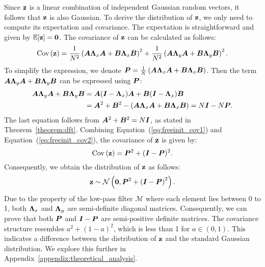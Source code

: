 Since $\mathbf{z}$ is a linear combination of independent Gaussian random vectors, it follows that $\mathbf{z}$ is also Gaussian. To derive the distribution of $\mathbf{z}$, we only need to compute its expectation and covariance.
The expectation is straightforward and given by $\mathbb{E}[\mathbf{z}]=\mathbf{0}$. 
The covariance of $\mathbf{z}$ can be calculated as follows:
\begin{equation}
\label{eq:freeinit_cov1}
    \mathrm{Cov}\left(\mathbf{z}\right) 
    = \frac{1}{N^2}\left( {\bm{A}}{\bm{\Lambda}}_x{\bm{A}} + {\bm{B}}{\bm{\Lambda}}_x{\bm{B}}\right)^2 +
      \frac{1}{N^2}\left( {\bm{A}}{\bm{\Lambda}}_y{\bm{A}} + {\bm{B}}{\bm{\Lambda}}_y{\bm{B}}\right)^2.
\end{equation}
To simplify the expression, we denote ${\bm{P}} = \frac{1}{N}\left( {\bm{A}}{\bm{\Lambda}}_x{\bm{A}}+{\bm{B}}{\bm{\Lambda}}_x{\bm{B}}\right)$. Then the term ${\bm{A}}{\bm{\Lambda}}_y{\bm{A}}+{\bm{B}}{\bm{\Lambda}}_y{\bm{B}}$ can be expressed using ${\bm{P}}$:
\begin{equation}
\label{eq:freeinit_cov2}
\begin{split}
     {\bm{A}}{\bm{\Lambda}}_y{\bm{A}} + 
      {\bm{B}}{\bm{\Lambda}}_y{\bm{B}} & = {\bm{A}}({\bm{I}}-{\bm{\Lambda}}_x){\bm{A}} + 
      {\bm{B}}({\bm{I}}-{\bm{\Lambda}}_x){\bm{B}} \\
      & = {\bm{A}}^2 + {\bm{B}}^2 - \left( {\bm{A}}{\bm{\Lambda}}_x{\bm{A}}+{\bm{B}}{\bm{\Lambda}}_x{\bm{B}}\right) = N{\bm{I}} - N{\bm{P}}.
\end{split}
\end{equation}
The last equation follows from $ {\bm{A}}^2+{\bm{B}}^2 =N{\bm{I}}$, as stated in Theorem~\ref{theorem:dft}. 
Combining Equation~(\ref{eq:freeinit_cov1}) and Equation~(\ref{eq:freeinit_cov2}), the covariance of $\mathbf{z}$ is given by:
\begin{equation}
    \mathrm{Cov}\left(\mathbf{z}\right) = {\bm{P}}^2 + ({\bm{I}}-{\bm{P}})^2.
\end{equation}
Consequently, we obtain the distribution of $\mathbf{z}$ as follows:
\begin{equation}
\label{eq:free_distribution}
    \mathbf{z}\sim\mathcal{N}\left(\mathbf{0}, {\bm{P}}^2 + \left({\bm{I}}-{\bm{P}}\right)^2\right).
\end{equation}
Due to the property of the low-pass filter $\mathcal{M}$ where each element lies between 0 to 1, both ${\bm{\Lambda}}_x$ and ${\bm{\Lambda}}_y$ are semi-definite diagonal matrices. Consequently, we can prove that both ${\bm{P}}$ and ${\bm{I}}-{\bm{P}}$ are semi-positive definite matrices. The covariance structure resembles $a^2+(1-a)^2$, which is less than 1 for $a\in(0, 1)$. This indicates a difference between the distribution of $\mathbf{z}$ and the standard Gaussian distribution. We explore this further in Appendix~\ref{appendix:theoretical_analysis}.


